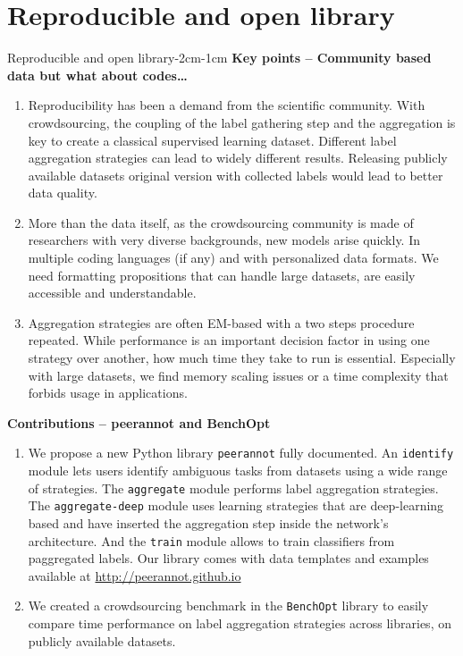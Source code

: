 \chapter{Reproducible and open library}
\label{chap:peerannot}
\enlargethispage{3\baselineskip}

\begin{keypointstwomargins}{Reproducible and open library}{-2cm}{-1cm}
        \textbf{Key points -- Community based data but what about codes\dots}
        \begin{enumerate}[leftmargin=*]
        \item Reproducibility has been a demand from the scientific community. With crowdsourcing, the coupling of the label gathering step and the aggregation is key to create a classical supervised learning dataset. Different label aggregation strategies can lead to widely different results. Releasing publicly available datasets original version with collected labels would lead to better data quality.
        \item More than the data itself, as the crowdsourcing community is made of researchers with very diverse backgrounds, new models arise quickly. In multiple coding languages (if any) and with personalized data formats. We need formatting propositions that can handle large datasets, are easily accessible and understandable.
        \item Aggregation strategies are often EM-based with a two steps procedure repeated. While performance is an important decision factor in using one strategy over another, how much time they take to run is essential. Especially with large datasets, we find memory scaling issues or a time complexity that forbids usage in applications. 
        \end{enumerate}

        \textbf{Contributions -- peerannot and BenchOpt}
        \begin{enumerate}[leftmargin=*,start=4]
        \item We propose a new Python library \texttt{peerannot} fully documented. An \texttt{identify} module lets users identify ambiguous tasks from datasets using a wide range of strategies. The \texttt{aggregate} module performs label aggregation strategies. The \texttt{aggregate-deep} module uses learning strategies that are deep-learning based and have inserted the aggregation step inside the network's architecture. And the \texttt{train} module allows to train classifiers from paggregated labels. Our library comes with data templates and examples available at \url{http://peerannot.github.io}
        \item We created a crowdsourcing benchmark in the \texttt{BenchOpt} library to easily compare time performance on label aggregation strategies across libraries, on publicly available datasets.
        \end{enumerate}
\end{keypointstwomargins}


